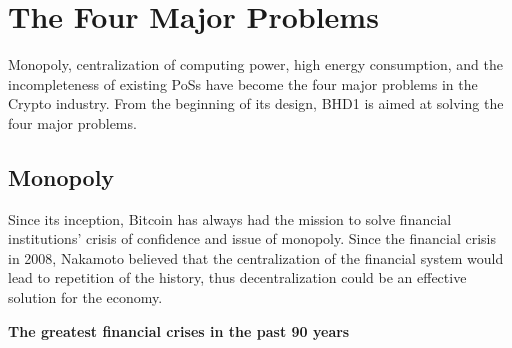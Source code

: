 \chapter{The Four Major Problems}
\begin{flushleft}
    Monopoly, centralization of computing power, high energy consumption, and the incompleteness of existing PoSs have become the four major problems in the Crypto industry. From the beginning of its design, BHD1 is aimed at solving the four major problems.
\end{flushleft}
\section{Monopoly}
\begin{flushleft}
    Since its inception, Bitcoin has always had the mission to solve financial institutions’ crisis of confidence and issue of monopoly. Since the financial crisis in 2008, Nakamoto believed that the centralization of the financial system would lead to repetition of the history, thus decentralization could be an effective solution for the economy.
\end{flushleft}
\begin{flushleft}
    \centering\textbf{The greatest financial crises in the past 90 years}
\end{flushleft}
